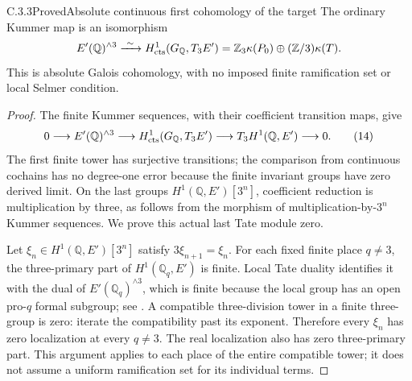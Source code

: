\begin{result}{C.3.3}{Proved}{Absolute continuous first cohomology of the target}
\label{prop:ghost-elliptic-h1}
The ordinary Kummer map is an isomorphism
\[
 E'(\mathbb Q)^{\wedge3}
       \xrightarrow{\ \sim\ }
 H^1_{\rm cts}(G_{\mathbb Q},T_3E')
       =\mathbb Z_3\kappa(P_0)
          \oplus(\mathbb Z/3)\kappa(T).
\]
This is absolute Galois cohomology, with no imposed
finite ramification set or local Selmer condition.
\end{result}
\begin{proof}
The finite Kummer sequences, with their coefficient
transition maps, give
\[
 0\longrightarrow E'(\mathbb Q)^{\wedge3}
 \longrightarrow H^1_{\rm cts}(G_{\mathbb Q},T_3E')
 \longrightarrow T_3H^1(\mathbb Q,E')
 \longrightarrow0.                                   \tag{14}
\]
The first finite tower has surjective transitions;
the comparison from continuous cochains has no
degree-one error because the finite invariant
groups have zero derived limit. On the last
groups \(H^1(\mathbb Q,E')[3^n]\), coefficient
reduction is multiplication by three, as follows
from the morphism of multiplication-by-\(3^n\)
Kummer sequences. We prove this actual last Tate
module zero.

Let \(\xi_n\in H^1(\mathbb Q,E')[3^n]\) satisfy
\(3\xi_{n+1}=\xi_n\). For each fixed finite
place \(q\ne3\), the three-primary part of
\(H^1(\mathbb Q_q,E')\) is finite. Local Tate
duality identifies it with the dual of
\(E'(\mathbb Q_q)^{\wedge3}\), which is finite
because the local group has an open pro-\(q\)
formal subgroup; see
\cite[I.3.3--3.5]{GhostMilneADT}.
A compatible three-division tower in a finite
three-group is zero: iterate the compatibility
past its exponent. Therefore every \(\xi_n\)
has zero localization at every \(q\ne3\).
The real localization also has zero three-primary
part. This argument applies to each place of the
entire compatible tower; it does not assume a
uniform ramification set for its individual terms.


\end{proof}
